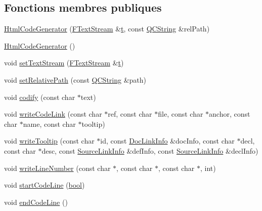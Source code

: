 \subsection*{Fonctions membres publiques}
\begin{DoxyCompactItemize}
\item 
\hyperlink{class_html_code_generator_a56e49ef654ba100c1d218aa99a881fe8}{Html\+Code\+Generator} (\hyperlink{class_f_text_stream}{F\+Text\+Stream} \&\hyperlink{058__bracket__recursion_8tcl_a69e959f6901827e4d8271aeaa5fba0fc}{t}, const \hyperlink{class_q_c_string}{Q\+C\+String} \&rel\+Path)
\item 
\hyperlink{class_html_code_generator_a8a10788cb7969a1c9bd11548a7d58b6a}{Html\+Code\+Generator} ()
\item 
void \hyperlink{class_html_code_generator_a9b5bfa3e5431129fb292ccde2cabcfe8}{set\+Text\+Stream} (\hyperlink{class_f_text_stream}{F\+Text\+Stream} \&\hyperlink{058__bracket__recursion_8tcl_a69e959f6901827e4d8271aeaa5fba0fc}{t})
\item 
void \hyperlink{class_html_code_generator_a9bc120e267a5830b05030cf6c74a3d41}{set\+Relative\+Path} (const \hyperlink{class_q_c_string}{Q\+C\+String} \&path)
\item 
void \hyperlink{class_html_code_generator_aa482ae62b65a2fd1cc6cda022e88c920}{codify} (const char $\ast$text)
\item 
void \hyperlink{class_html_code_generator_a5098b373d91b9674cc399132a321f040}{write\+Code\+Link} (const char $\ast$ref, const char $\ast$file, const char $\ast$anchor, const char $\ast$name, const char $\ast$tooltip)
\item 
void \hyperlink{class_html_code_generator_a6edc5ab4a379a6edfaac4e4c36db4178}{write\+Tooltip} (const char $\ast$id, const \hyperlink{struct_doc_link_info}{Doc\+Link\+Info} \&doc\+Info, const char $\ast$decl, const char $\ast$desc, const \hyperlink{struct_source_link_info}{Source\+Link\+Info} \&def\+Info, const \hyperlink{struct_source_link_info}{Source\+Link\+Info} \&decl\+Info)
\item 
void \hyperlink{class_html_code_generator_a926369daa75db9967dc5c6f818b5b406}{write\+Line\+Number} (const char $\ast$, const char $\ast$, const char $\ast$, int)
\item 
void \hyperlink{class_html_code_generator_afbc2414a5387b977150b015dfbd16c10}{start\+Code\+Line} (\hyperlink{qglobal_8h_a1062901a7428fdd9c7f180f5e01ea056}{bool})
\item 
void \hyperlink{class_html_code_generator_ab0909b2a97301c8da4fcbf83831c84b3}{end\+Code\+Line} ()

\end{DoxyCompactItemize}
